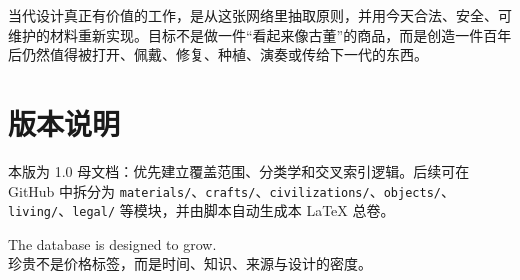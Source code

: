 \documentclass[lang=en,a4paper,11pt]{elegantpaper}
\begin{document}
当代设计真正有价值的工作，是从这张网络里抽取原则，并用今天合法、安全、可维护的材料重新实现。目标不是做一件“看起来像古董”的商品，而是创造一件百年后仍然值得被打开、佩戴、修复、种植、演奏或传给下一代的东西。


\section*{版本说明}
本版为 1.0 母文档：优先建立覆盖范围、分类学和交叉索引逻辑。后续可在 GitHub 中拆分为 \texttt{materials/}、\texttt{crafts/}、\texttt{civilizations/}、\texttt{objects/}、\texttt{living/}、\texttt{legal/} 等模块，并由脚本自动生成本 LaTeX 总卷。

\vfill
\begin{center}
\sffamily\color{Slate}
The database is designed to grow.\\
珍贵不是价格标签，而是时间、知识、来源与设计的密度。
\end{center}
\end{document}
